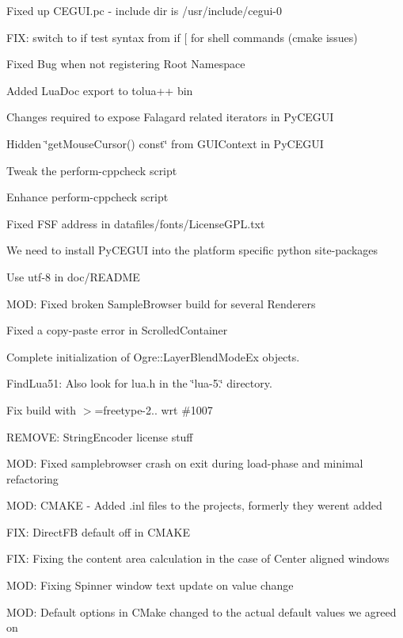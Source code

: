 \begin{DoxyItemize}
\item Fixed up C\+E\+G\+U\+I.\+pc -\/ include dir is /usr/include/cegui-\/0
\item F\+IX\+: switch to \textquotesingle{}if test\textquotesingle{} syntax from \textquotesingle{}if \mbox{[}\textquotesingle{} for shell commands (cmake issues)
\item Fixed Bug when not registering Root Namespace
\item Added Lua\+Doc export to tolua++ bin
\item Changes required to expose Falagard related iterators in Py\+C\+E\+G\+UI
\item Hidden \char`\"{}get\+Mouse\+Cursor() const\char`\"{} from G\+U\+I\+Context in Py\+C\+E\+G\+UI
\item Tweak the perform-\/cppcheck script
\item Enhance perform-\/cppcheck script
\item Fixed F\+SF address in datafiles/fonts/\+License\+G\+P\+L.\+txt
\item We need to install Py\+C\+E\+G\+UI into the platform specific python site-\/packages
\item Use utf-\/8 in doc/\+R\+E\+A\+D\+ME
\item M\+OD\+: Fixed broken Sample\+Browser build for several Renderers
\item Fixed a copy-\/paste error in Scrolled\+Container
\item Complete initialization of Ogre\+::\+Layer\+Blend\+Mode\+Ex objects.
\item Find\+Lua51\+: Also look for lua.\+h in the \char`\"{}lua-\/5.\char`\"{} directory.
\item Fix build with $>$=freetype-\/2.. wrt \#1007
\item R\+E\+M\+O\+VE\+: String\+Encoder license stuff
\item M\+OD\+: Fixed samplebrowser crash on exit during load-\/phase and minimal refactoring
\item M\+OD\+: C\+M\+A\+KE -\/ Added .inl files to the projects, formerly they werent added
\item F\+IX\+: Direct\+FB default off in C\+M\+A\+KE
\item F\+IX\+: Fixing the content area calculation in the case of Center aligned windows
\item M\+OD\+: Fixing Spinner window text update on value change
\item M\+OD\+: Default options in C\+Make changed to the actual default values we agreed on

\end{DoxyItemize}
